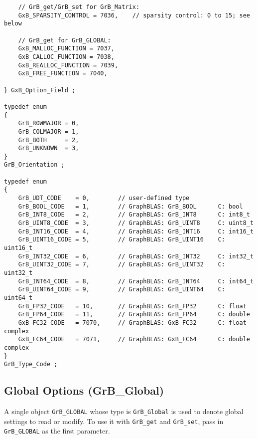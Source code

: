{\begin{verbatim}
    // GrB_get/GrB_set for GrB_Matrix:
    GxB_SPARSITY_CONTROL = 7036,    // sparsity control: 0 to 15; see below

    // GrB_get for GrB_GLOBAL:
    GxB_MALLOC_FUNCTION = 7037,
    GxB_CALLOC_FUNCTION = 7038,
    GxB_REALLOC_FUNCTION = 7039,
    GxB_FREE_FUNCTION = 7040,

} GxB_Option_Field ;

typedef enum
{
    GrB_ROWMAJOR = 0,
    GrB_COLMAJOR = 1,
    GrB_BOTH     = 2,
    GrB_UNKNOWN  = 3,
}
GrB_Orientation ;

typedef enum
{
    GrB_UDT_CODE    = 0,        // user-defined type
    GrB_BOOL_CODE   = 1,        // GraphBLAS: GrB_BOOL      C: bool
    GrB_INT8_CODE   = 2,        // GraphBLAS: GrB_INT8      C: int8_t
    GrB_UINT8_CODE  = 3,        // GraphBLAS: GrB_UINT8     C: uint8_t
    GrB_INT16_CODE  = 4,        // GraphBLAS: GrB_INT16     C: int16_t
    GrB_UINT16_CODE = 5,        // GraphBLAS: GrB_UINT16    C: uint16_t
    GrB_INT32_CODE  = 6,        // GraphBLAS: GrB_INT32     C: int32_t
    GrB_UINT32_CODE = 7,        // GraphBLAS: GrB_UINT32    C: uint32_t
    GrB_INT64_CODE  = 8,        // GraphBLAS: GrB_INT64     C: int64_t
    GrB_UINT64_CODE = 9,        // GraphBLAS: GrB_UINT64    C: uint64_t
    GrB_FP32_CODE   = 10,       // GraphBLAS: GrB_FP32      C: float
    GrB_FP64_CODE   = 11,       // GraphBLAS: GrB_FP64      C: double
    GxB_FC32_CODE   = 7070,     // GraphBLAS: GxB_FC32      C: float complex
    GxB_FC64_CODE   = 7071,     // GraphBLAS: GxB_FC64      C: double complex
}
GrB_Type_Code ; \end{verbatim}}

\newpage
\subsection{Global Options ({\sf GrB\_Global})}
\label{get_set_global}

A single object \verb'GrB_GLOBAL' whose type is \verb'GrB_Global' is used to
denote global settings to read or modify.  To use it with \verb'GrB_get' and
\verb'GrB_set', pass in \verb'GrB_GLOBAL' as the first parameter.

